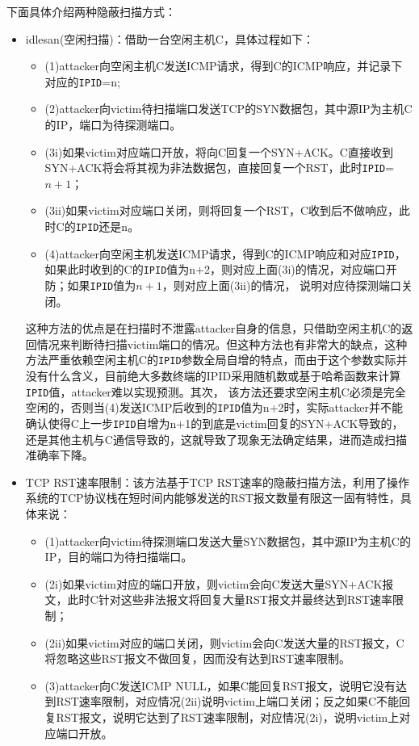 下面具体介绍两种隐蔽扫描方式：
\begin{itemize}
    \item idlesan(空闲扫描)：借助一台空闲主机C，具体过程如下：
    \begin{itemize}
        \item (1)attacker向空闲主机C发送ICMP请求，得到C的ICMP响应，并记录下对应的\texttt{IPID}=n;
        \item (2)attacker向victim待扫描端口发送TCP的SYN数据包，其中源IP为主机C的IP，端口为待探测端口。
        \item (3i)如果victim对应端口开放，将向C回复一个SYN+ACK。C直接收到SYN+ACK将会将其视为非法数据包，直接回复一个RST，此时\texttt{IPID}=$n+1$；
        \item (3ii)如果victim对应端口关闭，则将回复一个RST，C收到后不做响应，此时C的\texttt{IPID}还是n。
        \item (4)attacker向空闲主机发送ICMP请求，得到C的ICMP响应和对应\texttt{IPID}，如果此时收到的C的\texttt{IPID}值为n+2，则对应上面(3i)的情况，对应端口开防；如果\texttt{IPID}值为$n+1$，则对应上面(3ii)的情况，
        说明对应待探测端口关闭。
    \end{itemize}
    这种方法的优点是在扫描时不泄露attacker自身的信息，只借助空闲主机C的返回情况来判断待扫描victim端口的情况。但这种方法也有非常大的缺点，这种方法严重依赖空闲主机C的\texttt{IPID}参数全局自增的特点，而由于这个参数实际并没有什么含义，目前绝大多数终端的IPID采用随机数或基于哈希函数来计算\texttt{IPID}值，attacker难以实现预测。其次，
    该方法还要求空闲主机C必须是完全空闲的，否则当(4)发送ICMP后收到的\texttt{IPID}值为n+2时，实际attacker并不能确认使得C上一步\texttt{IPID}自增为n+1的到底是victim回复的SYN+ACK导致的，还是其他主机与C通信导致的，这就导致了现象无法确定结果，进而造成扫描准确率下降。

    \item TCP RST速率限制：该方法基于TCP RST速率的隐蔽扫描方法，利用了操作系统的TCP协议栈在短时间内能够发送的RST报文数量有限这一固有特性，具体来说：
    \begin{itemize}
        \item (1)attacker向victim待探测端口发送大量SYN数据包，其中源IP为主机C的IP，目的端口为待扫描端口。
        \item (2i)如果victim对应的端口开放，则victim会向C发送大量SYN+ACK报文，此时C针对这些非法报文将回复大量RST报文并最终达到RST速率限制；
        \item (2ii)如果victim对应的端口关闭，则victim会向C发送大量的RST报文，C将忽略这些RST报文不做回复，因而没有达到RST速率限制。
        \item (3)attacker向C发送ICMP NULL，如果C能回复RST报文，说明它没有达到RST速率限制，对应情况(2ii)说明victim上端口关闭；反之如果C不能回复RST报文，说明它达到了RST速率限制，对应情况(2i)，说明victim上对应端口开放。
    \end{itemize}
\end{itemize}



